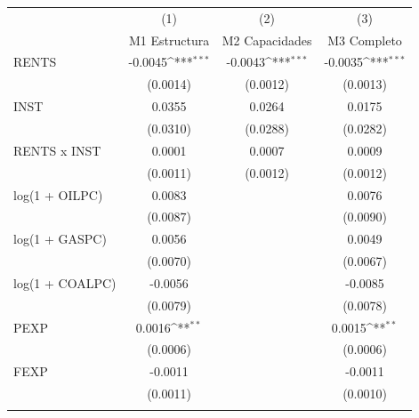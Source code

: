 {
\def\sym#1{\ifmmode^{#1}\else\(^{#1}\)\fi}
\begin{tabular}{l*{3}{c}}
\toprule
                    &\multicolumn{1}{c}{(1)}&\multicolumn{1}{c}{(2)}&\multicolumn{1}{c}{(3)}\\
                    &\multicolumn{1}{c}{M1 Estructura}&\multicolumn{1}{c}{M2 Capacidades}&\multicolumn{1}{c}{M3 Completo}\\
\midrule
RENTS               &     -0.0045\sym{***}&     -0.0043\sym{***}&     -0.0035\sym{***}\\
                    &    (0.0014)         &    (0.0012)         &    (0.0013)         \\
\addlinespace
INST                &      0.0355         &      0.0264         &      0.0175         \\
                    &    (0.0310)         &    (0.0288)         &    (0.0282)         \\
\addlinespace
RENTS x INST        &      0.0001         &      0.0007         &      0.0009         \\
                    &    (0.0011)         &    (0.0012)         &    (0.0012)         \\
\addlinespace
log(1 + OILPC)      &      0.0083         &                     &      0.0076         \\
                    &    (0.0087)         &                     &    (0.0090)         \\
\addlinespace
log(1 + GASPC)      &      0.0056         &                     &      0.0049         \\
                    &    (0.0070)         &                     &    (0.0067)         \\
\addlinespace
log(1 + COALPC)     &     -0.0056         &                     &     -0.0085         \\
                    &    (0.0079)         &                     &    (0.0078)         \\
\addlinespace
PEXP                &      0.0016\sym{**} &                     &      0.0015\sym{**} \\
                    &    (0.0006)         &                     &    (0.0006)         \\
\addlinespace
FEXP                &     -0.0011         &                     &     -0.0011         \\
                    &    (0.0011)         &                     &    (0.0010)         \\
\addlinespace

\end{tabular}}
